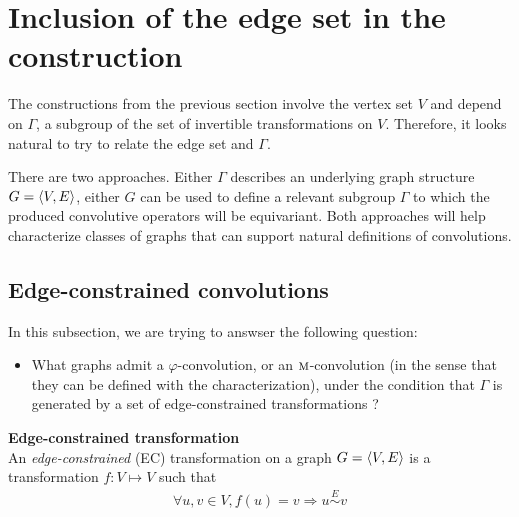 \section{Inclusion of the edge set in the construction}
\label{sec:edges}


The constructions from the previous section involve the vertex set $V$ and depend on $\Gamma$, a subgroup of the set of invertible transformations on $V$. Therefore, it looks natural to try to relate the edge set and $\Gamma$.

There are two approaches. Either $\Gamma$ describes an underlying graph structure $G = \langle V, E \rangle$, either $G$ can be used to define a relevant subgroup $\Gamma$ to which the produced convolutive operators will be equivariant. Both approaches will help characterize classes of graphs that can support natural definitions of convolutions.




\subsection{Edge-constrained convolutions}
\label{sec:cayley}

In this subsection, we are trying to answser the following question:
\begin{itemize}
	\item What graphs admit a $\varphi$-convolution, or an $\operatorname{\textsc{m}}$-convolution (in the sense that they can be defined with the characterization), under the condition that $\Gamma$ is generated by a set of edge-constrained transformations ?
\end{itemize}

\begin{definition}\textbf{Edge-constrained transformation}\\
An \emph{edge-constrained} (EC) transformation on a graph $G = \langle V, E \rangle$ is a transformation $f: V \mapsto V$ such that
\begin{gather*}
\forall u,v \in V, f(u) = v \Rightarrow u \overset{E}{\sim} v
\end{gather*}
\end{definition}

